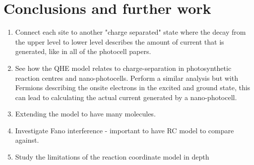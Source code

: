 \documentclass[]{article}
\begin{document}
\section{Conclusions and further work}
\begin{enumerate}
\item Connect each site to another "charge separated" state where the decay from the upper level to lower level describes the amount of current that is generated, like in all of the photocell papers.
\item See how the QHE model relates to charge-separation in photosynthetic reaction centres and nano-photocells. Perform a similar analysis but with Fermions describing the onsite electrons in the excited and ground state, this can lead to calculating the actual current generated by a nano-photocell.
\item Extending the model to have many molecules. 
\item Investigate Fano interference - important to have RC model to compare against.
\item Study the limitations of the reaction coordinate model in depth
\end{enumerate}
\begin{appendices}

\end{appendices}
\end{document}
